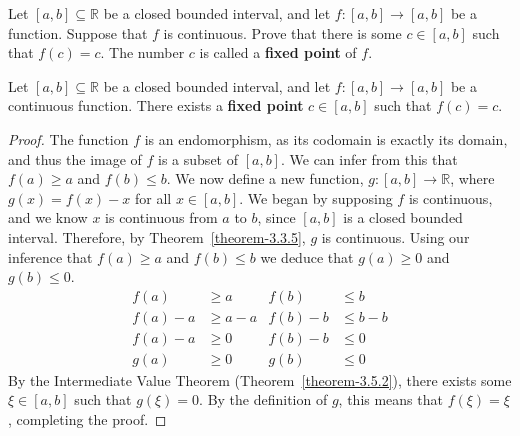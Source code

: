 \begin{exercise}
	Let $\left[ a, b \right] \subseteq \mathbb{R}$ be a closed bounded interval, and let $f:\left[ a, b \right] \to \left[ a, b \right]$ be a function. Suppose that $f$ is continuous. Prove that there is some $c \in \left[ a, b \right]$ such that $f\left(c\right) = c$. The number $c$ is called a \textbf{fixed point} of $f$.
\end{exercise}
\begin{proposition}
	Let $\left[ a, b \right] \subseteq \mathbb{R}$ be a closed bounded interval, and let $f:\left[a,b\right]\to\left[a,b\right]$ be a continuous function. There exists a \textbf{fixed point} $c \in \left[a,b\right]$ such that $f\left(c\right)=c$.
\end{proposition}
\begin{proof}
	The function $f$ is an endomorphism, as its codomain is exactly its domain, and thus the image of $f$ is a subset of $\left[ a, b \right]$. We can infer from this that $f\left(a\right) \geq a$ and $f\left(b\right) \leq b$.
	\newline\newline
	We now define a new function, $g : \left[ a, b \right] \to \mathbb{R}$, where $g\left(x\right) = f\left(x\right) - x$ for all $x \in \left[ a, b \right]$. We began by supposing $f$ is continuous, and we know $x$ is continuous from $a$ to $b$, since $\left[ a, b \right]$ is a closed bounded interval. Therefore, by Theorem~\ref{theorem-3.3.5}, $g$ is continuous.
	\newline\newline
	Using our inference that $f\left(a\right) \geq a$ and $f\left(b\right) \leq b$ we deduce that $g\left(a\right) \geq 0$ and $g\left(b\right) \leq 0$.
	\begin{align*}
	f\left(a\right) &\geq a & f\left(b\right) &\leq b \\
	f\left(a\right) - a &\geq a - a & f\left(b\right) - b &\leq b - b \\
	f\left(a\right) - a &\geq 0 & f\left(b\right) - b &\leq 0 \\
	g\left(a\right) &\geq 0 & g\left(b\right) &\leq 0
	\end{align*}
	By the Intermediate Value Theorem (Theorem~\ref{theorem-3.5.2}), there exists some $\xi \in \left[ a, b \right]$ such that $g\left(\xi\right)=0$. By the definition of $g$, this means that $f\left(\xi\right)=\xi$, completing the proof.
\end{proof}
